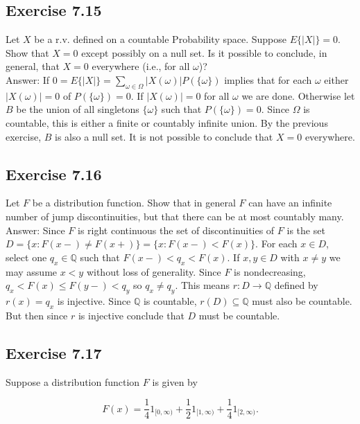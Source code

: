 \documentclass{article}
\begin{document}
\subsection*{Exercise 7.15}

Let $X$ be a r.v. defined on a countable Probability space. Suppose $E\{|X|\} = 0$. Show that $X = 0$ except possibly on a null set. Is it possible to conclude, in general, that $X = 0$ everywhere (i.e., for all $\omega$)? \\

Answer: If $0 = E\{|X|\} = \sum_{\omega \in \Omega} |X(\omega)|P(\{\omega\})$ implies that for each $\omega$ either $|X(\omega)| = 0$ of $P(\{\omega\}) = 0$. If $|X(\omega)| = 0$ for all $\omega$ we are done. Otherwise let $B$ be the union of all singletons $\{\omega\}$ such that $P(\{\omega\}) = 0$. Since $\Omega$ is countable, this is either a finite or countably infinite union. By the previous exercise, $B$ is also a null set. It is not possible to conclude that $X = 0$ everywhere. 

\subsection*{Exercise 7.16}

Let $F$ be a distribution function. Show that in general $F$ can have an infinite number of jump discontinuities, but that there can be at most countably many. \\

Answer: Since $F$ is right continuous the set of discontinuities of $F$ is the set $D = \{x : F(x-) \neq F(x+)\} = \{x: F(x-) < F(x)\}$. For each $x \in D$, select one $q_x \in \mathbb{Q}$ such that $F(x-) < q_x < F(x)$. If $x,y \in D$ with $x \neq y$ we may assume $x < y$ without loss of generality. Since $F$ is nondecreasing, $q_x < F(x) \leq F(y-) < q_y$ so $q_x \neq q_y$. This means $r: D \rightarrow \mathbb{Q}$ defined by $r(x) = q_x$ is injective. Since $\mathbb{Q}$ is countable, $r(D) \subseteq \mathbb{Q}$ must also be countable. But then since $r$ is injective conclude that $D$ must be countable. 

\subsection*{Exercise 7.17}

Suppose a distribution function $F$ is given by

$$
F(x) = \frac{1}{4} 1_{[0,\infty)} + \frac{1}{2}1_{[1,\infty)} + \frac{1}{4}1_{[2,\infty)}.
$$
\end{document}
